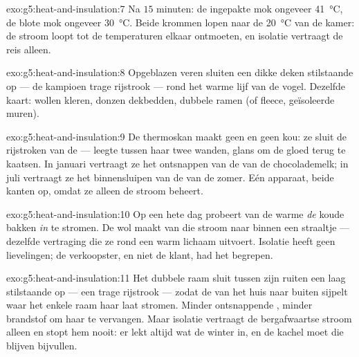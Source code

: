 \begin{solution}{exo:g5:heat-and-insulation:7}
Na $15$ minuten: de ingepakte mok ongeveer \qty{41}{\celsius}, de
blote mok ongeveer \qty{30}{\celsius}. Beide krommen lopen naar de
\qty{20}{\celsius} van de kamer: de stroom loopt tot de
temperaturen elkaar ontmoeten, en isolatie vertraagt de reis alleen.
\end{solution}

\begin{solution}{exo:g5:heat-and-insulation:8}
Opgeblazen veren sluiten een dikke deken stilstaande  op --- de
kampioen trage rijstrook --- rond het warme lijf van de vogel.
Dezelfde kaart: wollen kleren, donzen dekbedden, dubbele ramen (of
fleece, geïsoleerde muren).
\end{solution}

\begin{solution}{exo:g5:heat-and-insulation:9}
De thermoskan maakt geen  en geen kou: ze sluit de rijstroken
van de  --- leegte tussen haar twee wanden, glans om de gloed
terug te kaatsen. In januari vertraagt ze het ontsnappen van de
 van de chocolademelk; in juli vertraagt ze het binnensluipen
van de  van de zomer. Eén apparaat, beide kanten op, omdat ze
alleen de stroom beheert.
\end{solution}

\begin{solution}{exo:g5:heat-and-insulation:10}
Op een hete dag probeert  van de warme  \emph{de} koude
bakken \emph{in} te stromen. De wol maakt van die stroom naar binnen
een straaltje --- dezelfde vertraging die ze rond een warm lichaam
uitvoert. Isolatie heeft geen lievelingen; de verkoopster, en niet de
klant, had het begrepen.
\end{solution}

\begin{solution}{exo:g5:heat-and-insulation:11}
Het dubbele raam sluit tussen zijn ruiten een laag stilstaande
 op --- een trage rijstrook --- zodat de  van het huis
naar buiten sijpelt waar het enkele raam haar laat stromen. Minder
ontsnappende , minder brandstof om haar te vervangen. Maar
isolatie vertraagt de bergafwaartse stroom alleen en stopt hem nooit:
er lekt altijd wat  de winter in, en de kachel moet die blijven
bijvullen.
\end{solution}
